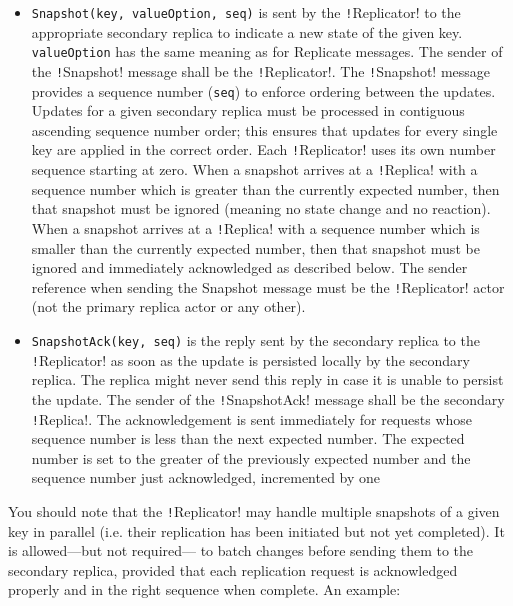\documentclass{article}
\begin{document}
\begin{itemize}
    \item \texttt{Snapshot(key, valueOption, seq)} is sent by the \texttt!Replicator! to the appropriate secondary replica to indicate a new state of the given key. \texttt{valueOption} has the same meaning as for Replicate messages. The sender of the \texttt!Snapshot! message shall be the \texttt!Replicator!. The \texttt!Snapshot! message provides a sequence number (\texttt{seq}) to enforce ordering between the updates. Updates for a given secondary replica must be processed in contiguous ascending sequence number order; this ensures that updates for every single key are applied in the correct order. Each \texttt!Replicator! uses its own number sequence starting at zero. When a snapshot arrives at a \texttt!Replica! with a sequence number which is greater than the currently expected number, then that snapshot must be ignored (meaning no state change and no reaction). When a snapshot arrives at a \texttt!Replica! with a sequence number which is smaller than the currently expected number, then that snapshot must be ignored and immediately acknowledged as described below. The sender reference when sending the Snapshot message must be the \texttt!Replicator! actor (not the primary replica actor or any other).
    \item \texttt{SnapshotAck(key, seq)} is the reply sent by the secondary replica to the \texttt!Replicator! as soon as the update is persisted locally by the secondary replica. The replica might never send this reply in case it is unable to persist the update. The sender of the \texttt!SnapshotAck! message shall be the secondary \texttt!Replica!. The acknowledgement is sent immediately for requests whose sequence number is less than the next expected number. The expected number is set to the greater of the previously expected number and the sequence number just acknowledged, incremented by one
\end{itemize}

You should note that the \texttt!Replicator! may handle multiple snapshots of a given key in parallel (i.e. their replication has been initiated but not yet completed). It is allowed—but not required— to batch changes before sending them to the secondary replica, provided that each replication request is acknowledged properly and in the right sequence when complete. An example:
\end{document}

